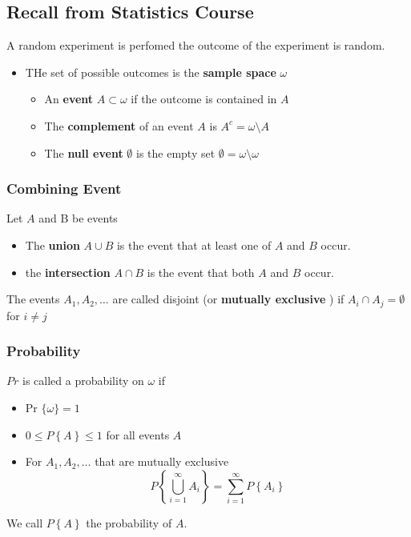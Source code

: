 \documentclass{article}
\theoremstyle{remark}
\begin{document}
\subsection{Recall from Statistics Course}%
\label{sub:recall_from_statistics_course}

A random experiment is perfomed the outcome of the experiment is random.
\begin{itemize}
  \item THe set of possible outcomes is the \textbf{sample space}  $\omega $
    \begin{itemize}
      \item An \textbf{event}  $A \subset \omega $  if the outcome is contained in $A$
      \item The \textbf{complement}  of an event $A$ is  $A^{c} = \omega  \setminus A$
      \item The \textbf{null event} $\emptyset$ is the empty set $\emptyset = \omega \setminus \omega $
    \end{itemize}
\end{itemize}

\subsubsection{Combining Event}%
\label{ssub:combining_event}

Let $A$ and B be events
\begin{itemize}
  \item The \textbf{union} $A \cup  B$ is the event that at least one of $A$ and $B$ occur.
  \item the \textbf{intersection}  $A \cap B$ is the event that both $A$ and $B$ occur.
\end{itemize}

The events $A_{1}, A_{2}, \ldots$ are called disjoint (or \textbf{mutually exclusive} ) if $A_{i} \cap A_{j} = \emptyset$ for $i \neq j$

\subsubsection{Probability}%
\label{ssub:probability}

$Pr$ is called a probability on $\omega $ if

\begin{itemize}
  \item Pr $\{ \omega \} = 1  $
  \item $0 \le P\left\{ A \right\} \le 1$ for all events $A$
  \item For $A_{1}, A_{2} , \ldots$ that are mutually exclusive \[
  P \left\{ \bigcup_{i = 1}^{\infty}A_{i}  \right\} = \sum_{i=1}^{\infty} P \left\{ A_{i} \right\}
  \]
\end{itemize}
We call $P\left\{ A \right\}$ the probability of $A$.
\end{document}
